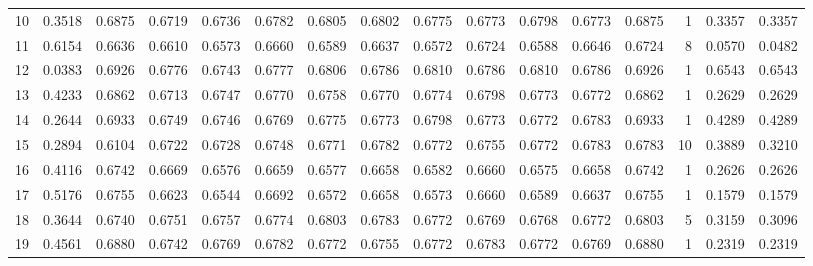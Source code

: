 \begin{tabular}{lrrrrrrrrrrrrrrr}
10 &      0.3518 &  0.6875 &  0.6719 &  0.6736 &  0.6782 &  0.6805 &  0.6802 &  0.6775 &  0.6773 &  0.6798 &   0.6773 &     0.6875 &      1 &                    0.3357 &                     0.3357 \\
11 &      0.6154 &  0.6636 &  0.6610 &  0.6573 &  0.6660 &  0.6589 &  0.6637 &  0.6572 &  0.6724 &  0.6588 &   0.6646 &     0.6724 &      8 &                    0.0570 &                     0.0482 \\
12 &      0.0383 &  0.6926 &  0.6776 &  0.6743 &  0.6777 &  0.6806 &  0.6786 &  0.6810 &  0.6786 &  0.6810 &   0.6786 &     0.6926 &      1 &                    0.6543 &                     0.6543 \\
13 &      0.4233 &  0.6862 &  0.6713 &  0.6747 &  0.6770 &  0.6758 &  0.6770 &  0.6774 &  0.6798 &  0.6773 &   0.6772 &     0.6862 &      1 &                    0.2629 &                     0.2629 \\
14 &      0.2644 &  0.6933 &  0.6749 &  0.6746 &  0.6769 &  0.6775 &  0.6773 &  0.6798 &  0.6773 &  0.6772 &   0.6783 &     0.6933 &      1 &                    0.4289 &                     0.4289 \\
15 &      0.2894 &  0.6104 &  0.6722 &  0.6728 &  0.6748 &  0.6771 &  0.6782 &  0.6772 &  0.6755 &  0.6772 &   0.6783 &     0.6783 &     10 &                    0.3889 &                     0.3210 \\
16 &      0.4116 &  0.6742 &  0.6669 &  0.6576 &  0.6659 &  0.6577 &  0.6658 &  0.6582 &  0.6660 &  0.6575 &   0.6658 &     0.6742 &      1 &                    0.2626 &                     0.2626 \\
17 &      0.5176 &  0.6755 &  0.6623 &  0.6544 &  0.6692 &  0.6572 &  0.6658 &  0.6573 &  0.6660 &  0.6589 &   0.6637 &     0.6755 &      1 &                    0.1579 &                     0.1579 \\
18 &      0.3644 &  0.6740 &  0.6751 &  0.6757 &  0.6774 &  0.6803 &  0.6783 &  0.6772 &  0.6769 &  0.6768 &   0.6772 &     0.6803 &      5 &                    0.3159 &                     0.3096 \\
19 &      0.4561 &  0.6880 &  0.6742 &  0.6769 &  0.6782 &  0.6772 &  0.6755 &  0.6772 &  0.6783 &  0.6772 &   0.6769 &     0.6880 &      1 &                    0.2319 &                     0.2319 \\
\bottomrule
\end{tabular}
